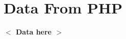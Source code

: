 \documentclass{article}
\newcommand{\placeholder}[1]{\textbf{$<$ #1 $>$}}
\newcommand{\test}{\placeholder{Data here}}
\begin{document}
    \section{Data From PHP}
    \test{}
\end{document}
